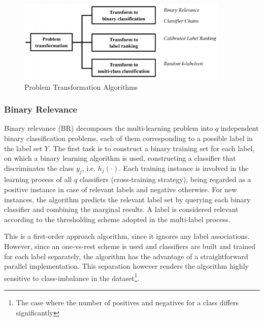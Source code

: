 \documentclass[12pt]{report}
\begin{document}
	\begin{figure}[H]
		\centering
		\includegraphics[width=0.9\textwidth]{pt.png}
		\caption{Problem Transformation Algorithms}
		\centering
    \label{figure:ptm}
	\end{figure}

	\subsubsection*{Binary Relevance}
	Binary relevance (BR) decomposes the multi-learning problem into $q$
  independent binary classification problems, each of them corresponding to a
  possible label in the label set $Y$. The first task is to construct a
  binary training set for each label, on which a binary learning
  algorithm is used, constructing a classifier that discriminates the
  class $y_j$, i.e. $h_j(\cdot)$. Each training instance is involved in the
  learning process of all $q$ classifiers (cross-training strategy), being 
  regarded as a positive instance in case of relevant labels and negative
  otherwise. For new instances, the algorithm predicts the relevant label set by
  querying each binary classifier and combining the marginal results. A label is
  considered relevant according to the thresholding scheme adopted in the
  multi-label process.
	
	This is a first-order approach algorithm, since it ignores any
  label associations. However, since an one-vs-rest scheme is used and
  classifiers are built and trained for each label separately, the algorithm has the
  advantage of a straightforward parallel implementation. This separation
  however renders the algorithm highly sensitive to class-imbalance in the dataset\footnote{The case where
    the number of positives and negatives for a class differs significantly}.
	
\end{document}
